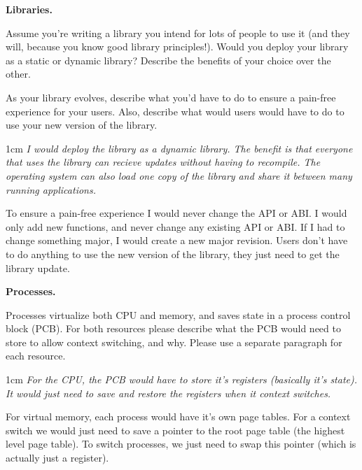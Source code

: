 \documentclass[12pt]{article}
\newenvironment{answer}{\begin{adjustwidth}{1cm}{}\itshape}{\end{adjustwidth}}
\begin{document}
\newpage

\textbf{Libraries.}

\vspace{1em}

Assume you're writing a library you intend for lots of people to use it (and
they will, because you know good library principles!). Would you deploy your
library as a static or dynamic library? Describe the benefits of your choice
over the other.

\vspace{1em}

As your library evolves, describe what you'd have to do to ensure a pain-free
experience for your users. Also, describe what would users would have to do to
use your new version of the library.

\vspace{1em}

\begin{answer}
  I would deploy the library as a dynamic library. The benefit is that everyone
  that uses the library can recieve updates without having to recompile.
  The operating system can also load one copy of the library and share it
  between many running applications.

  To ensure a pain-free experience I would never change the API or ABI. I would
  only add new functions, and never change any existing API or ABI. If I had
  to change something major, I would create a new major revision. Users don't
  have to do anything to use the new version of the library, they just need
  to get the library update.
\end{answer}

\newpage

\textbf{Processes.}

\vspace{1em}

Processes virtualize both CPU and memory, and saves state in a process control
block (PCB). For both resources please describe what the PCB would need to store
to allow context switching, and why. Please use a separate paragraph for each
resource.

\vspace{1em}

\begin{answer}
  For the CPU, the PCB would have to store it's registers (basically it's
  state). It would just need to save and restore the registers when it context
  switches.

  For virtual memory, each process would have it's own page tables. For a
  context switch we would just need to save a pointer to the root page table
  (the highest level page table). To switch processes, we just need to swap this
  pointer (which is actually just a register).
\end{answer}
\end{document}
